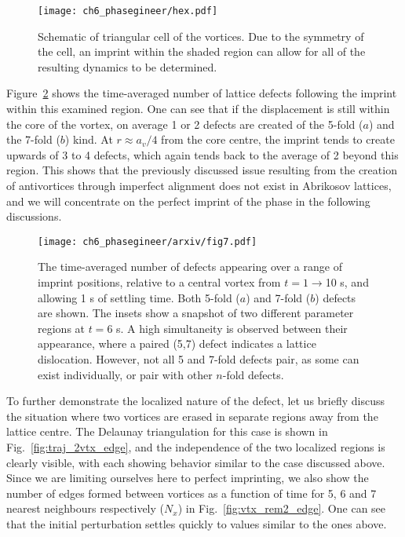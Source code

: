 \begin{figure}\centering
    \texttt{[image: ch6\_phasegineer/hex.pdf]}
    \caption{Schematic of triangular cell of the vortices. Due to the symmetry of the cell, an imprint within the shaded region can allow for all of the resulting dynamics to be determined.} \label{fig:hex}
\end{figure}

Figure~\ref{fig:lattice_misalign} shows the time-averaged number of lattice defects following the imprint within this examined region. One can see that if the displacement is still within the core of the vortex, on average 1 or 2 defects are created of the 5-fold ($a$) and the 7-fold ($b$) kind. At $r\approx a_v/4$ from the core centre, the imprint tends to create upwards of 3 to 4 defects, which again tends back to the average of 2 beyond this region. This shows that the previously discussed issue resulting from the creation of antivortices through imperfect alignment does not exist in Abrikosov lattices, and we will concentrate on the perfect imprint of the phase in the following discussions.

\begin{figure}\centering
    \texttt{[image: ch6\_phasegineer/arxiv/fig7.pdf]}
    \caption{The time-averaged number of defects appearing over a range of imprint positions, relative to a central vortex from $t=1\rightarrow$10 s, and allowing 1 s of settling time. Both 5-fold ($a$) and 7-fold ($b$) defects are shown. The insets show a snapshot of two different parameter regions at $t=6$ s. A high simultaneity is observed between their appearance, where a paired (5,7) defect indicates a lattice dislocation. However, not all 5 and 7-fold defects pair, as some can exist individually, or pair with other $n$-fold defects.} \label{fig:lattice_misalign}
\end{figure}

To further demonstrate the localized nature of the defect, let us briefly discuss the situation where two vortices are erased in separate regions away from the lattice centre. The Delaunay triangulation for this case is shown in Fig.~\ref{fig:traj_2vtx_edge}, and the independence of the two localized regions is clearly visible, with each showing behavior similar to the case discussed above. Since we are limiting ourselves here to perfect imprinting, we also show the number of edges formed between vortices as a function of time for 5, 6 and 7 nearest neighbours respectively ($N_x$) in Fig.~\ref{fig:vtx_rem2_edge}. One can see that the initial perturbation settles quickly to values similar to the ones above.

